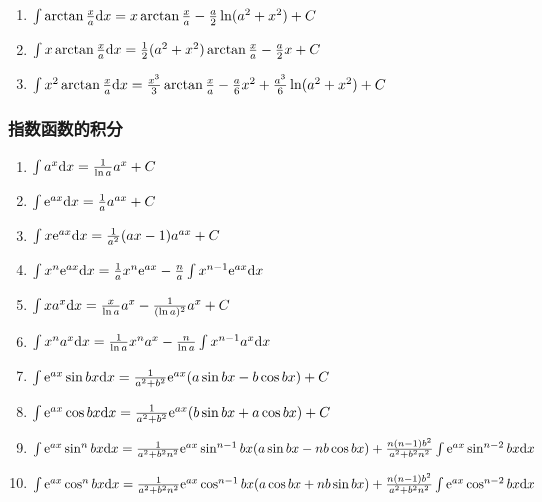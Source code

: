 \begin{footnotesize}
\begin {enumerate}
\item $ \int \arctan \frac{x}{a} \mathrm{d} x=x \arctan \frac{x}{a}-\frac{a}{2}\ln (a^2+x^2)+C $

\item $ \int x\arctan \frac{x}{a} \mathrm{d} x = \frac{1}{2}(a^2+x^2)\arctan \frac{x}{a} -\frac{a}{2}x+C $

\item $ \int x^2 \arctan \frac{x}{a} \mathrm{d} x= \frac{x^3}{3} \arctan \frac{x}{a} - \frac{a}{6}x^2 + \frac{a^3}{6} \ln (a^2+x^2)+C $

\end {enumerate}

\subsubsection*{指数函数的积分}

\begin{enumerate}

\item $ \int a^x \mathrm{d} x= \frac{1}{\ln a} a^x + C$

\item $ \int \mathrm{e} ^{ax}\mathrm{d} x=\frac{1}{a}a^{ax}+C $ 

\item $ \int x \mathrm{e}  ^ {ax} \mathrm{d} x=\frac{1}{a^2}(ax-1)a^{ax} +C $

\item $ \int x^n \mathrm{e} ^{ax} \mathrm{d} x=\frac{1}{a}x^n \mathrm{e} ^{ax}-\frac{n}{a} \int x^{n-1} \mathrm{e} ^ {ax} \mathrm{d} x $

\item $ \int x a^x \mathrm{d} x = \frac{x}{\ln a}a^x-\frac{1}{(\ln a)^2}a^x+C $

\item $ \int x^n a^x \mathrm{d} x= \frac{1}{\ln a}x^n a^x-\frac{n}{\ln a}\int x^{n-1}a^x \mathrm{d} x $

\item $ \int \mathrm{e} ^{ax} \sin bx \mathrm{d} x = \frac{1}{a^2+b^2}\mathrm{e} ^{ax}(a \sin bx - b \cos bx)+C $

\item $ \int \mathrm{e} ^{ax} \cos bx \mathrm{d} x = \frac{1}{a^2+b^2}\mathrm{e} ^{ax}(b \sin bx + a \cos bx)+C $

\item $ \int \mathrm{e} ^{ax} \sin ^ n bx \mathrm{d} x=\frac{1}{a^2+b^2 n^2}\mathrm{e} ^{ax} \sin ^ {n-1} bx (a \sin bx -nb \cos bx) +\frac{n(n-1)b^2}{a^2+b^2 n^2}\int \mathrm{e} ^{ax} \sin ^{n-2} bx \mathrm{d} x $

\item $ \int \mathrm{e} ^{ax} \cos ^ n bx \mathrm{d} x=\frac{1}{a^2+b^2 n^2}\mathrm{e} ^{ax} \cos ^ {n-1} bx (a \cos bx +nb \sin bx) +\frac{n(n-1)b^2}{a^2+b^2 n^2}\int \mathrm{e} ^{ax} \cos ^{n-2} bx \mathrm{d} x $


\end{enumerate}
\end{footnotesize}
